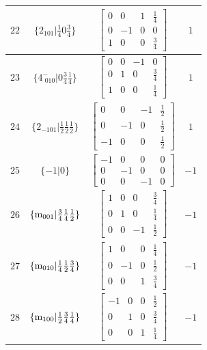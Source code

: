 \documentclass[fleqn,8pt]{jsarticle}
\begin{document}
\begin{longtable}{cccc}
$ 22 $ & $ \{2{}_{101}|\frac{1}{4} 0 \frac{3}{4}\} $ & $ \begin{bmatrix} 0 & 0 & 1 & \frac{1}{4} \\ 0 & -1 & 0 & 0 \\ 1 & 0 & 0 & \frac{3}{4} \end{bmatrix} $ & $ 1 $ \\ \hline
$ 23 $ & $ \{4^{-}_{\,\,010}|0 \frac{3}{4} \frac{1}{4}\} $ & $ \begin{bmatrix} 0 & 0 & -1 & 0 \\ 0 & 1 & 0 & \frac{3}{4} \\ 1 & 0 & 0 & \frac{1}{4} \end{bmatrix} $ & $ 1 $ \\ \hline
$ 24 $ & $ \{2{}_{-101}|\frac{1}{2} \frac{1}{2} \frac{1}{2}\} $ & $ \begin{bmatrix} 0 & 0 & -1 & \frac{1}{2} \\ 0 & -1 & 0 & \frac{1}{2} \\ -1 & 0 & 0 & \frac{1}{2} \end{bmatrix} $ & $ 1 $ \\ \hline
$ 25 $ & $ \{-1|0\} $ & $ \begin{bmatrix} -1 & 0 & 0 & 0 \\ 0 & -1 & 0 & 0 \\ 0 & 0 & -1 & 0 \end{bmatrix} $ & $ -1 $ \\ \hline
$ 26 $ & $ \{{\rm m}_{001}|\frac{3}{4} \frac{1}{4} \frac{1}{2}\} $ & $ \begin{bmatrix} 1 & 0 & 0 & \frac{3}{4} \\ 0 & 1 & 0 & \frac{1}{4} \\ 0 & 0 & -1 & \frac{1}{2} \end{bmatrix} $ & $ -1 $ \\ \hline
$ 27 $ & $ \{{\rm m}_{010}|\frac{1}{4} \frac{1}{2} \frac{3}{4}\} $ & $ \begin{bmatrix} 1 & 0 & 0 & \frac{1}{4} \\ 0 & -1 & 0 & \frac{1}{2} \\ 0 & 0 & 1 & \frac{3}{4} \end{bmatrix} $ & $ -1 $ \\ \hline
$ 28 $ & $ \{{\rm m}_{100}|\frac{1}{2} \frac{3}{4} \frac{1}{4}\} $ & $ \begin{bmatrix} -1 & 0 & 0 & \frac{1}{2} \\ 0 & 1 & 0 & \frac{3}{4} \\ 0 & 0 & 1 & \frac{1}{4} \end{bmatrix} $ & $ -1 $ \\ \hline

\end{longtable}
\end{document}
